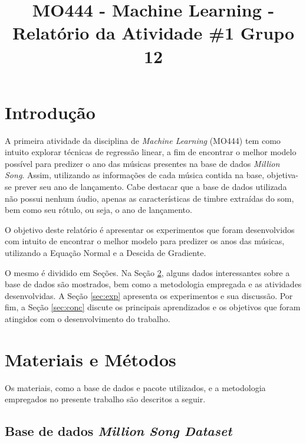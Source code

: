 \documentclass[conference]{IEEEtran}
\begin{document}
\title{MO444 - Machine Learning - Relatório da Atividade \#1 Grupo 12}

\author{
\and
{}
}

\maketitle

\section{Introdução}

A primeira atividade da disciplina de \textit{Machine Learning} (MO444) tem como intuito explorar técnicas de regressão linear, a fim de encontrar o melhor modelo possível para predizer o ano das músicas presentes na base de dados \textit{Million Song}. Assim, utilizando as informações de cada música contida na base, objetiva-se prever seu ano de lançamento. Cabe destacar que a base de dados utilizada não possui nenhum áudio, apenas as características de timbre extraídas do som, bem como seu rótulo, ou seja, o ano de lançamento.

O objetivo deste relatório é apresentar os experimentos que foram desenvolvidos com intuito de encontrar o melhor modelo para predizer os anos das músicas, utilizando a Equação Normal e a Descida de Gradiente.

O mesmo é dividido em Seções. Na Seção \ref{sec:meto}, alguns dados interessantes sobre a base de dados são mostrados, bem como a metodologia empregada e as atividades desenvolvidas. A Seção \ref{sec:exp} apresenta os experimentos e sua discussão. Por fim, a Seção \ref{sec:conc} discute os principais aprendizados e os objetivos que foram atingidos com o desenvolvimento do trabalho.

\section{Materiais e Métodos} \label{sec:meto}

Os materiais, como a base de dados e pacote utilizados, e a metodologia empregados no presente trabalho são descritos a seguir.

\subsection{Base de dados \textit{Million Song Dataset}} \label{sec:base}
\end{document}
